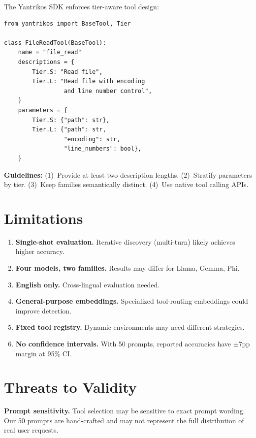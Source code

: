 \documentclass[11pt]{article}
\begin{document}
The Yantrikos SDK enforces tier-aware tool design:

\begin{verbatim}
from yantrikos import BaseTool, Tier

class FileReadTool(BaseTool):
    name = "file_read"
    descriptions = {
        Tier.S: "Read file",
        Tier.L: "Read file with encoding
                 and line number control",
    }
    parameters = {
        Tier.S: {"path": str},
        Tier.L: {"path": str,
                 "encoding": str,
                 "line_numbers": bool},
    }
\end{verbatim}

\textbf{Guidelines:} (1)~Provide at least two description lengths. (2)~Stratify parameters by tier. (3)~Keep families semantically distinct. (4)~Use native tool calling APIs.

\section{Limitations}

\begin{enumerate}[nosep,leftmargin=*]
  \item \textbf{Single-shot evaluation.} Iterative discovery (multi-turn) likely achieves higher accuracy.
  \item \textbf{Four models, two families.} Results may differ for Llama, Gemma, Phi.
  \item \textbf{English only.} Cross-lingual evaluation needed.
  \item \textbf{General-purpose embeddings.} Specialized tool-routing embeddings could improve detection.
  \item \textbf{Fixed tool registry.} Dynamic environments may need different strategies.
  \item \textbf{No confidence intervals.} With 50 prompts, reported accuracies have $\pm$7pp margin at 95\% CI.
\end{enumerate}

\section{Threats to Validity}

\textbf{Prompt sensitivity.} Tool selection may be sensitive to exact prompt wording. Our 50 prompts are hand-crafted and may not represent the full distribution of real user requests.
\end{document}
